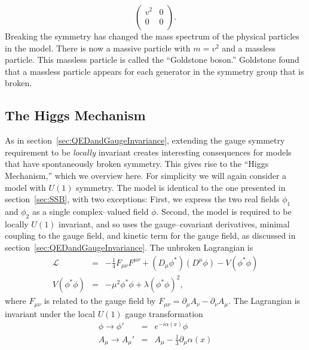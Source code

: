 \begin{equation}
  \left(
  \begin{array}{cc}
    v^2 & 0 \\
    0 & 0 \\
  \end{array}
  \right).
  \nonumber
\end{equation}
Breaking the symmetry has changed the mass spectrum of the physical particles in
the model.  There is now a massive particle with $m=v^2$ and a massless
particle.  This massless particle is called the ``Goldstone boson.''
 Goldstone found~\cite{GoldstoneBosons} that a massless
particle appears for each generator in the symmetry group that is broken.

\subsection{The Higgs Mechanism}
\label{sec:HiggsMech}

As in section~\ref{sec:QEDandGaugeInvariance}, extending the gauge symmetry
requirement to be \emph{locally} invariant creates interesting consequences for
models that have spontaneously broken symmetry.  This gives rise to the ``Higgs
Mechanism,'' which we overview here.  For simplicity we will again consider a
model with $U(1)$ symmetry.  The model is identical to the one presented in 
section~\ref{sec:SSB}, with two exceptions: First, we express the two real fields
$\phi_1$ and $\phi_2$ as a single complex--valued field $\phi$.  Second, the
model is required to be locally $U(1)$ invariant, and so uses the
gauge--covariant derivatives, minimal coupling to the gauge field, and kinetic
term for the gauge field, as discussed in
section~\ref{sec:QEDandGaugeInvariance}.  The unbroken Lagrangian is
\begin{eqnarray}
  \mathcal{L} &=& -\frac{1}{4} F_{\mu\nu}F^{\mu\nu} 
  + (D_\mu \phi^*)(D^\mu \phi) - V(\phi^*\phi) \label{eq:LocalInvariantU1} \\
  V(\phi^*\phi) &=& -\mu^2 \phi^*\phi + \lambda (\phi^*\phi)^2,
  \label{eq:PotentialLocalInvariantU1}
\end{eqnarray}
where $F_{\mu\nu}$ is related to the gauge field by $F_{\mu\nu} = \partial_\mu
A_\nu - \partial_\nu A_\mu$.  The Lagrangian is invariant under the local $U(1)$
gauge transformation
\begin{eqnarray}
  \phi \to \phi' &=& e^{-i \alpha(x)} \phi \nonumber \\
  A_\mu \to A_\mu' &=& A_\mu - \frac{1}{3} \partial_\mu \alpha(x) 
\end{eqnarray}

